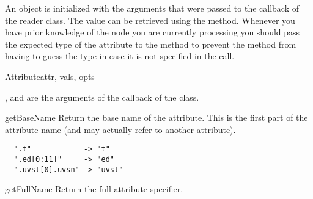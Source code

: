 An  object is initialized with the arguments that
were passed to the  callback of the reader
class. The value can be retrieved using the 
method. Whenever you have prior knowledge of the node you are 
currently processing you should pass the expected type of the
attribute to the  method to prevent the
method from having to guess the type in case it is not specified
in the  call.

\begin{classdesc}{Attribute}{attr, vals, opts}

,  and  are the arguments of the 
 callback of the  class.

\end{classdesc}

\begin{methoddesc}{getBaseName}{}
Return the base name of the attribute. This is the first part of the
attribute name (and may actually refer to another attribute).

\begin{verbatim}
  ".t"            -> "t"
  ".ed[0:11]"     -> "ed"
  ".uvst[0].uvsn" -> "uvst"
\end{verbatim}
\end{methoddesc}

\begin{methoddesc}{getFullName}{}
Return the full attribute specifier.
\end{methoddesc}

